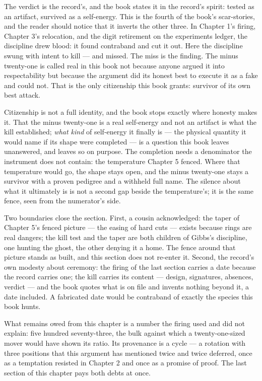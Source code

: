 The verdict is the record's, and the book states it in the record's spirit: tested
as an artifact, survived as a self-energy. This is the fourth of the book's
scar-stories, and the reader should notice that it inverts the other three. In
Chapter 1's firing, Chapter 3's relocation, and the digit retirement on the
experiments ledger, the
discipline drew blood: it found contraband and cut it out. Here the discipline
swung with intent to kill --- and missed. The miss is the finding. The minus
twenty-one is called real in this book not because anyone argued it into
respectability but because the argument did its honest best to execute it as a
fake and could not. That is the only citizenship this book grants: survivor of
its own best attack.

Citizenship is not a full identity, and the book stops exactly where honesty
makes it. That the minus twenty-one is a real self-energy and not an artifact is
what the kill established; \emph{what kind} of self-energy it finally is --- the
physical quantity it would name if its shape were completed --- is a question
this book leaves unanswered, and leaves so on purpose. The completion needs a
denominator the instrument does not contain: the temperature Chapter 5 fenced.
Where that temperature would go, the shape stays open, and the minus twenty-one
stays a survivor with a proven pedigree and a withheld full name. The silence
about what it ultimately is is not a second gap beside the temperature's; it is
the same fence, seen from the numerator's side.

Two boundaries close the section. First, a cousin acknowledged: the taper of
Chapter 5's fenced picture --- the easing of hard cuts --- exists because rings
are real dangers; the kill test and the taper are both children of Gibbs's
discipline, one hunting the ghost, the other denying it a home. The fence around
that picture stands as built, and this section does not re-enter it. Second, the
record's own modesty about ceremony: the firing of the last section carries a
date because the record carries one; the kill carries its content --- design,
signatures, absences, verdict --- and the book quotes what is on file and invents
nothing beyond it, a date included. A fabricated date would be contraband of
exactly the species this book hunts.

What remains owed from this chapter is a number the firing used and did not
explain: five hundred seventy-three, the bulk against which a twenty-one-sized
mover would have shown its ratio. Its provenance is a cycle --- a rotation with
three positions that this argument has mentioned twice and twice deferred, once
as a temptation resisted in Chapter 2 and once as a promise of proof. The last
section of this chapter pays both debts at once.


